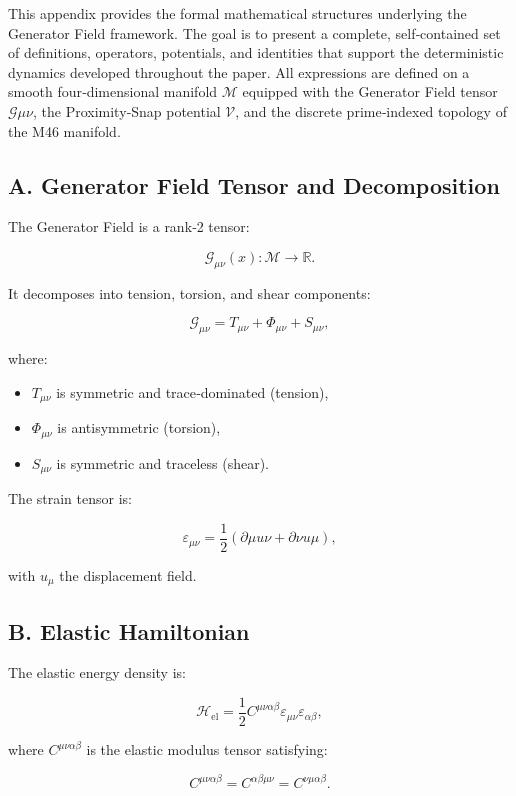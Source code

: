 \documentclass[reprint,amsmath,amssymb,aps,prl,floatfix]{revtex4-2}
\begin{document}
\begin{itemize}
This appendix provides the formal mathematical structures underlying the Generator Field framework. The goal is to present a complete, self‑contained set of definitions, operators, potentials, and identities that support the deterministic dynamics developed throughout the paper. All expressions are defined on a smooth four‑dimensional manifold \(\mathcal{M}\) equipped with the Generator Field tensor \(\mathcal{G}{\mu\nu}\), the Proximity‑Snap potential \(\mathcal{V}\), and the discrete prime‑indexed topology of the M46 manifold.

\subsection{A. Generator Field Tensor and Decomposition}

The Generator Field is a rank‑2 tensor:

\[
\mathcal{G}_{\mu\nu}(x) : \mathcal{M} \rightarrow \mathbb{R}.
\]

It decomposes into tension, torsion, and shear components:

\[
\mathcal{G}_{\mu\nu}
=
T_{\mu\nu}
+
\Phi_{\mu\nu}
+
S_{\mu\nu},
\]

where:
\begin{itemize}
\item \(T_{\mu\nu}\) is symmetric and trace‑dominated (tension),
\item \(\Phi_{\mu\nu}\) is antisymmetric (torsion),
\item \(S_{\mu\nu}\) is symmetric and traceless (shear).
\end{itemize}

The strain tensor is:

\[
\varepsilon_{\mu\nu}
=
\frac{1}{2}
\left(
\partial\mu u\nu + \partial\nu u\mu
\right),
\]

with \(u_\mu\) the displacement field.

\subsection{B. Elastic Hamiltonian}

The elastic energy density is:

\[
\mathcal{H}_{\mathrm{el}}
=
\frac{1}{2}
C^{\mu\nu\alpha\beta}
\varepsilon_{\mu\nu}
\varepsilon_{\alpha\beta},
\]

where \(C^{\mu\nu\alpha\beta}\) is the elastic modulus tensor satisfying:

\[
C^{\mu\nu\alpha\beta}
=
C^{\alpha\beta\mu\nu}
=
C^{\nu\mu\alpha\beta}.
\]


\end{itemize}
\end{document}
